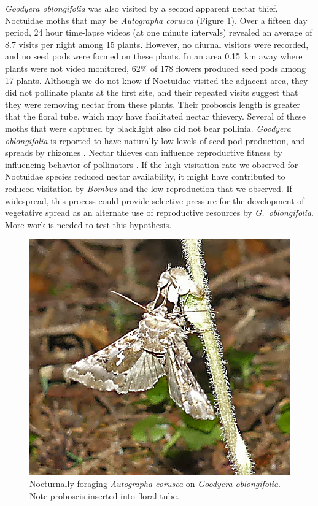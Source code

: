 \begin{multicols}{2}
\emph{Goodyera oblongifolia} was also visited by a second apparent
nectar thief, Noctuidae moths that may be \emph{Autographa corusca}
(Figure \ref{Goodyera_oblongifolia_Noctuidae}). Over a fifteen day period, 24 hour time-lapse videos (at
one minute intervals) revealed an average of 8.7 visits per night
among 15 plants. However, no diurnal visitors were recorded, and no seed
pods were formed on these plants. In an area 0.15~km away where plants
were not video monitored, 62\% of 178 flowers produced seed pods among
17 plants. Although we do not know if Noctuidae visited the adjacent
area, they did not pollinate plants at the first site, and their
repeated visits suggest that they were removing nectar from these
plants. Their proboscis length is greater that the floral tube, which
may have facilitated nectar thievery. Several of these moths that were
captured by blacklight also did not bear pollinia. \emph{Goodyera
oblongifolia} is reported to have naturally low levels of seed pod
production, and spreads by rhizomes \citep{Ackerman1975}. Nectar thieves can
influence reproductive fitness by influencing behavior of pollinators
\citep{Zhangetal2014}. If the high visitation rate we observed for
Noctuidae species reduced nectar availability, it might have contributed
to reduced visitation by \emph{Bombus} and the low reproduction that we
observed. If widespread, this process could provide selective pressure
for the development of vegetative spread as an alternate use of
reproductive resources by \emph{G.\ oblongifolia}. More work is needed to
test this hypothesis.

\begin{figure}[H]
\begin{center}
\vspace{2mm}
\includegraphics[width=\textwidth]{img/Goodyera_oblongifolia_Noctuidae.jpg}
\caption{Nocturnally foraging \emph{Autographa corusca} on \emph{Goodyera oblongifolia}.  Note proboscis inserted into floral tube.}
\label{Goodyera_oblongifolia_Noctuidae}
\end{center}
\end{figure}





\end{multicols}
